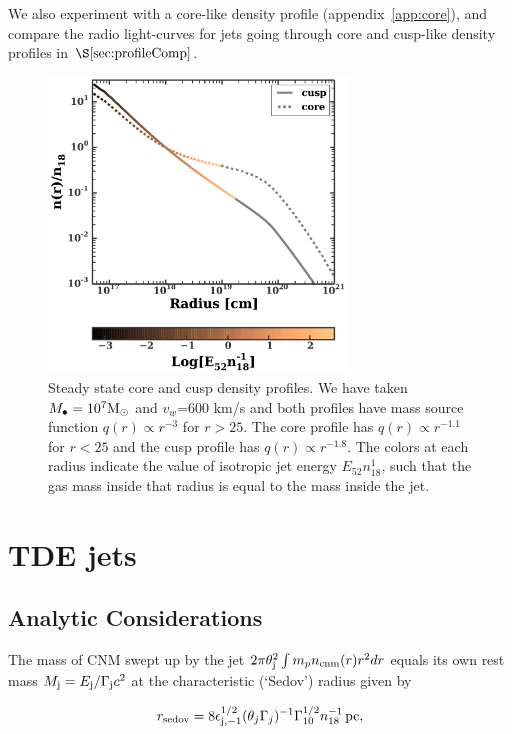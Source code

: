 \documentclass[usenatbib,fleqn]{mnras}
\newcommand{\Mbh}[1][]{M_{\bullet#1}}
\newcommand{\Msun}{{\rm M_\odot}}
\begin{document}
We also experiment with a core-like density profile
(appendix~\ref{app:core}), and compare the radio light-curves for jets
going through core and cusp-like density profiles in
$\S\ref{sec:profileComp}$.


\begin{figure}
\includegraphics[width=8cm]{sedov_radius.pdf}
\caption{\label{fig:profiles} Steady state core and cusp density
  profiles. We have taken $\Mbh=10^{7} \Msun$ and $v_w$=600 km/s and
  both profiles have mass source function $q(r) \propto
  r^{-3}$ for $r > 25$. The core profile has $q(r) \propto
  r^{-1.1}$ for $r < 25$ and the cusp profile has $q(r)
  \propto r^{-1.8}$.  The colors at each radius indicate the value of
  isotropic jet energy $E_{52} n_{18}^{1}$, such that the gas mass
  inside that radius is equal to the mass inside the jet.}
\end{figure}




\section{TDE jets}
\label{sec:jet}

\subsection{Analytic Considerations}
\label{sec:analytic}


The mass of CNM swept up by the jet $2\pi\theta_{\rm j}^{2}\int m_p
n_{\rm cnm}(r) r^{2}dr$ equals its own rest mass $M_{\rm j} = E_{\rm
  j}/\Gamma_{\rm j}c^{2}$ at the characteristic (`Sedov') radius given
by 

\begin{equation}
r_{\rm sedov} = 8 \epsilon_{\rm
  j,-1}^{1/2} (\theta_j
\Gamma_j)^{-1}\Gamma_{10}^{1/2} n_{\rm 18}^{-1}\,{\rm pc}, 
\end{equation}
\end{document}
